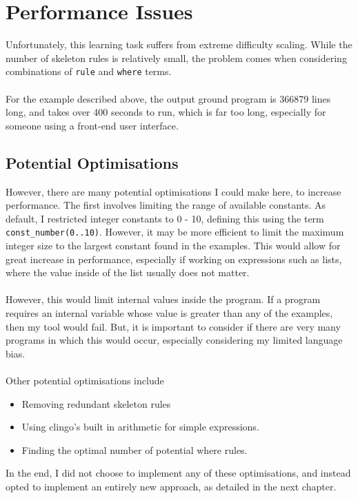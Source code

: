 \pagebreak

\section{Performance Issues}
Unfortunately, this learning task suffers from extreme difficulty scaling. While the number of skeleton rules is relatively small, the problem comes when considering combinations of \lstinline{rule} and \lstinline{where} terms.\\ \\ %
For the example described above, the output ground program is 366879 lines long, and takes over 400 seconds to run, which is far too long, especially for someone using a front-end user interface.

\subsection{Potential Optimisations}
However, there are many potential optimisations I could make here, to increase performance. The first involves limiting the range of available constants. As default, I restricted integer constants to 0 - 10, defining this using the term \lstinline{const_number(0..10)}. However, it may be more efficient to limit the maximum integer size to the largest constant found in the examples. This would allow for great increase in performance, especially if working on expressions such as lists, where the value inside of the list usually does not matter. \\ \\ %
However, this would limit internal values inside the program. If a program requires an internal variable whose value is greater than any of the examples, then my tool would fail. But, it is important to consider if there are very many programs in which this would occur, especially considering my limited language bias. \\ \\
Other potential optimisations include
\begin{itemize}
\item Removing redundant skeleton rules
\item Using clingo's built in arithmetic for simple expressions.
\item Finding the optimal number of potential where rules.
\end{itemize}
In the end, I did not choose to implement any of these optimisations, and instead opted to implement an entirely new approach, as detailed in the next chapter.

\pagebreak
%
%